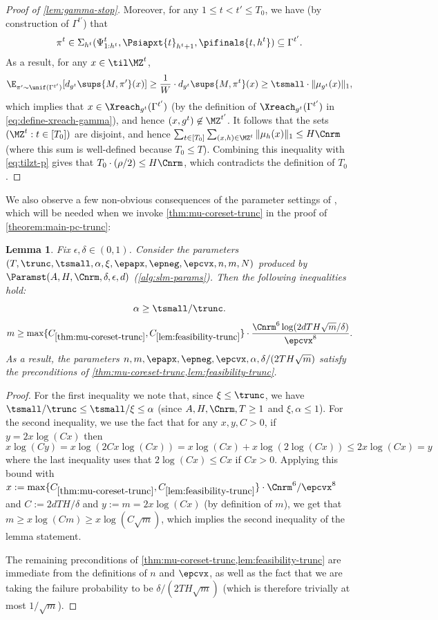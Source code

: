 \documentclass[11pt, oneside]{article}
\theoremstyle{plain}
\newtheorem{lemma}[theorem]{Lemma}
\theoremstyle{definition}
\numberwithin{theorem}{section}
\renewcommand{\^}[1]{^{(#1)}}
\begin{document}
\begin{proof}[Proof of \cref{lem:gamma-stop}]
  Moreover, for any $1 \leq t < t' \leq T_0$, we have (by construction of $\Gamma^{t'}$) that \[\pi^t \in \Sigma_{h^t}(\Psi^t_{1:h^t},\Psiapxt{t}_{h^t+1}, \pifinals{t,h^t}) \subseteq \Gamma^{t'}.\] As a result, for any $x \in \til\MZ^t$,
  \begin{align}
\E_{\pi' \sim \unif(\Gamma^{t'})}[d_{g^t}\sups{M, \pi'}(x)] \geq \frac{1}{W} \cdot d_{g^t}\sups{M, \pi^t}(x) \geq \tsmall \cdot \| \mu_{g^t}(x) \|_1\nonumber,
  \end{align}
  which implies that $x \in \Xreach_{g^t}(\Gamma^{t'})$ (by the definition of $\Xreach_{g^t}(\Gamma^{t'})$ in \cref{eq:define-xreach-gamma}), and hence $(x, g^t) \not\in \MZ^{t'}$. %
  It follows that the sets $(\MZ^t: t \in [T_0])$ are disjoint, and hence $\sum_{t \in [T_0]} \sum_{(x,h) \in \MZ^t} \| \mu_h(x) \|_1 \leq H \Cnrm$ (where this sum is well-defined because $T_0 \leq T$).  Combining this inequality with \cref{eq:tilzt-p} gives that $T_0 \cdot(\rho/2) \leq H\Cnrm$, which contradicts the definition of $T_0$. 
\end{proof}


We also observe a few non-obvious consequences of the parameter settings of \Paramst, which will be needed when we invoke \cref{thm:mu-coreset-trunc} in the proof of \cref{theorem:main-pc-trunc}:

\begin{lemma}\label{lemma:mess-facts}
Fix $\epsilon,\delta\in(0,1)$. Consider the parameters $(T,\trunc,\tsmall,\alpha,\xi,\epapx,\epneg,\epcvx,n,m,N)$ produced by $\Paramst(A,H,\Cnrm,\delta,\epsilon,d)$ (\cref{alg:slm-params}). Then the following inequalities hold:
\[ \alpha \geq \tsmall / \trunc.\]
\[ m \geq \max\{C_{\ref{thm:mu-coreset-trunc}},C_{\ref{lem:feasibility-trunc}}\} \cdot \frac{\Cnrm^6 \log(2dTH\sqrt{m}/\delta)}{\epcvx^8}.\]
As a result, the parameters $n,m,\epapx,\epneg,\epcvx,\alpha,\delta/(2TH\sqrt{m})$ satisfy the preconditions of \cref{thm:mu-coreset-trunc,lem:feasibility-trunc}.
\end{lemma}

\begin{proof}
  For the first inequality we note that, since $\xi \leq \trunc$, we have $\tsmall/\trunc \leq \tsmall/\xi \leq \alpha$ (since $A,H,\Cnrm,T \geq 1$ and $\xi, \alpha \leq 1$). %
  For the second inequality, we use the fact that for any $x,y,C>0$, if $y = 2x\log (Cx)$ then
\[ x\log (Cy) = x\log(2Cx\log(Cx)) = x\log(Cx) + x\log(2\log(Cx)) \leq 2x\log(Cx) = y\]
where the last inequality uses that $2\log(Cx) \leq Cx$ if $Cx >0$. %
Applying this bound with $x := \max\{C_{\ref{thm:mu-coreset-trunc}}, C_{\ref{lem:feasibility-trunc}}\} \cdot \Cnrm^6/\epcvx^8$ and $C := 2dTH/\delta$ and $y := m = 2x\log(Cx)$ (by definition of $m$), we get that $m \geq x\log(Cm) \geq x\log(C\sqrt{m})$, which implies the second inequality of the lemma statement.

The remaining preconditions of \cref{thm:mu-coreset-trunc,lem:feasibility-trunc} are immediate from the definitions of $n$ and $\epcvx$, as well as the fact that we are taking the failure probability to be $\delta/(2TH\sqrt{m})$ (which is therefore trivially at most $1/\sqrt{m}$).
\end{proof}
\end{document}
